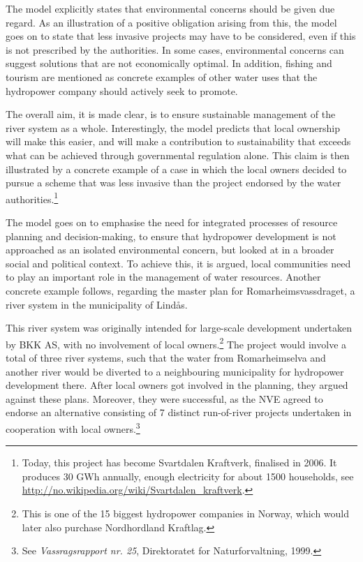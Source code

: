 The model explicitly states that environmental concerns should be given due regard. As an illustration of a positive obligation arising from this, the model goes on to state that less invasive projects may have to be considered, even if this is not prescribed by the authorities. In some cases, environmental concerns can suggest solutions that are not economically optimal. In addition, fishing and tourism are mentioned as concrete examples of other water uses that the hydropower company should actively seek to promote.

The overall aim, it is made clear, is to ensure sustainable management of the river system as a whole. Interestingly, the model predicts that local ownership will make this easier, and will make a contribution to sustainability that exceeds what can be achieved through governmental regulation alone. This claim is then illustrated by a concrete example of a case in which the local owners decided to pursue a scheme that was less invasive than the project endorsed by the water authorities.\footnote{Today, this project has become Svartdalen Kraftverk, finalised in 2006. It produces 30 GWh annually, enough electricity for about 1500 households, see \url{http://no.wikipedia.org/wiki/Svartdalen_kraftverk}.}

The model goes on to emphasise the need for integrated processes of resource planning and decision-making, to ensure that hydropower development is not approached as an isolated environmental concern, but looked at in a broader social and political context. To achieve this, it is argued, local communities need to play an important role in the management of water resources. Another concrete example follows, regarding the master plan for Romarheimsvassdraget, a river system in the municipality of Lindås. 

This river system was originally intended for large-scale development undertaken by BKK AS, with no involvement of local owners.\footnote{This is one of the 15 biggest hydropower companies in Norway, which would later also purchase Nordhordland Kraftlag.} The project would involve a total of three river systems, such that the water from Romarheimselva and another river would be diverted to a neighbouring municipality for hydropower development there. After local owners got involved in the planning, they argued against these plans. Moreover, they were successful, as the NVE agreed to endorse an alternative consisting of 7 distinct run-of-river projects undertaken in cooperation with local owners.\footnote{See {\it Vassragsrapport nr. 25}, Direktoratet for Naturforvaltning, 1999.}

